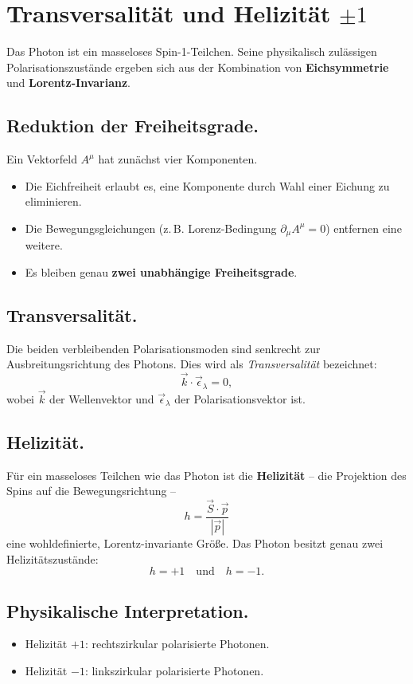 \section{Transversalität und Helizität \( \pm 1 \)}
\label{anhangA:transversalitaet}

Das Photon ist ein masseloses Spin-1-Teilchen. Seine physikalisch
zulässigen Polarisationszustände ergeben sich aus der Kombination
von \textbf{Eichsymmetrie} und \textbf{Lorentz-Invarianz}.

\subsection*{Reduktion der Freiheitsgrade.}
Ein Vektorfeld \( A^\mu \) hat zunächst vier Komponenten.
\begin{itemize}
	\item Die Eichfreiheit erlaubt es, eine Komponente durch Wahl 
	einer Eichung zu eliminieren.
	\item Die Bewegungsgleichungen (z.\,B. Lorenz-Bedingung 
	\( \partial_\mu A^\mu = 0 \)) entfernen eine weitere.
	\item Es bleiben genau \textbf{zwei unabhängige Freiheitsgrade}.
\end{itemize}

\subsection*{Transversalität.}
Die beiden verbleibenden Polarisationsmoden sind 
senkrecht zur Ausbreitungsrichtung des Photons.  
Dies wird als \emph{Transversalität} bezeichnet:
\[
\vec{k} \cdot \vec{\epsilon}_\lambda = 0,
\]
wobei \( \vec{k} \) der Wellenvektor und 
\( \vec{\epsilon}_\lambda \) der Polarisationsvektor ist.

\subsection*{Helizität.}
Für ein masseloses Teilchen wie das Photon ist die 
\textbf{Helizität} – die Projektion des Spins auf die 
Bewegungsrichtung –
\[
h = \frac{\vec{S} \cdot \vec{p}}{|\vec{p}|}
\]
eine wohldefinierte, Lorentz-invariante Größe.  
Das Photon besitzt genau zwei Helizitätszustände:
\[
h = +1 \quad \text{und} \quad h = -1 .
\]

\subsection*{Physikalische Interpretation.}
\begin{itemize}
	\item Helizität \( +1 \): rechtszirkular polarisierte Photonen.
	\item Helizität \( -1 \): linkszirkular polarisierte Photonen.
\end{itemize}

